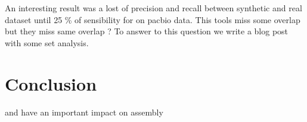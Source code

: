 \documentclass[main.tex]{subfiles}
\begin{document}
An interesting result was a lost of precision and recall between synthetic and real dataset until 25 \% of sensibility for  on pacbio data. This tools miss some overlap but they miss same overlap ? To answer to this question we write a blog post with some set analysis.



\section{Conclusion}

\yacrd and \fpa have an important impact on assembly 


\end{document}
